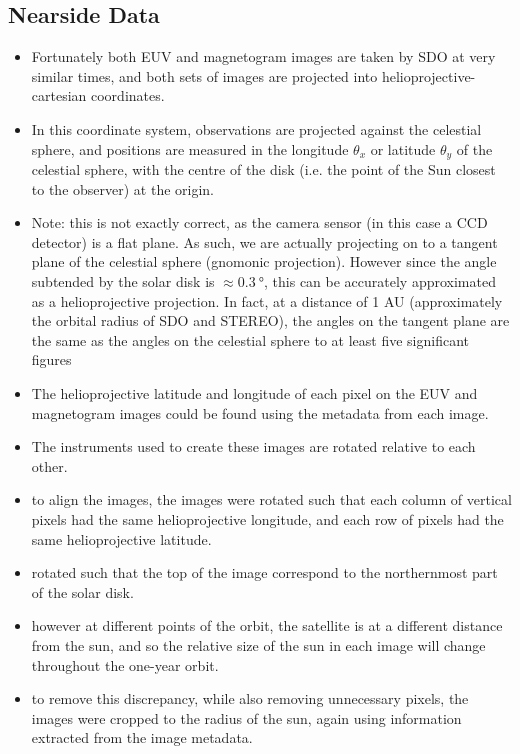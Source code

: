 \documentclass[11pt,a4paper,onecolumn]{report}
\begin{document}
\subsection{Nearside Data}
\begin{itemize}
  \item Fortunately both EUV and magnetogram images are taken by SDO at very similar
  times, and both sets of images are projected into helioprojective-cartesian
  coordinates.
  \item In this coordinate system, observations are projected against the
  celestial sphere, and positions are measured in the longitude \(\theta_x\) or
  latitude \(\theta_y\) of the celestial sphere, with the centre of the disk
  (i.e. the point of the Sun closest to the observer) at the origin.
  \item Note: this is not exactly correct, as the camera sensor (in this case a
  CCD detector) is a flat plane. As such, we are actually projecting on to a
  tangent plane of the celestial sphere (gnomonic projection). However since the
  angle subtended by the solar disk is \(\approx \SI[]{0.3}[]{\degree} \), this
  can be accurately approximated as a helioprojective projection. In fact, at a
  distance of 1 AU (approximately the orbital radius of SDO and STEREO), the
  angles on the tangent plane are the same as the angles on the celestial sphere
  to at least five significant figures \cite{thompson_w_t_coordinate_2006}
  \item The helioprojective latitude and longitude of each pixel on the EUV and
  magnetogram images could be found using the metadata from each image.
  \item The instruments used to create these images are rotated relative to each
  other.
  \item to align the images, the images were rotated such that each column of
  vertical pixels had the same helioprojective longitude, and each row of pixels
  had the same helioprojective latitude.
  \item rotated such that the top of the image correspond to the northernmost part
  of the solar disk.
  \item however at different points of the orbit, the satellite is at a different
  distance from the sun, and so the relative size of the sun in each image will
  change throughout the one-year orbit.
  \item to remove this discrepancy, while also removing unnecessary pixels, the
  images were cropped to the radius of the sun, again using information
  extracted from the image metadata.
\end{itemize}
\end{document}
